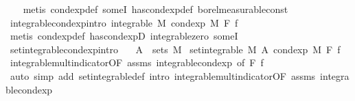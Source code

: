 \begin{isabellebody}
%
\isadelimproof
\ \ %
\endisadelimproof
%
\isatagproof
{}\isamarkupfalse%
\ {\isacharparenleft}{\kern0pt}metis\ cond{\isacharunderscore}{\kern0pt}exp{\isacharunderscore}{\kern0pt}def\ someI\ has{\isacharunderscore}{\kern0pt}cond{\isacharunderscore}{\kern0pt}exp{\isacharunderscore}{\kern0pt}def\ borel{\isacharunderscore}{\kern0pt}measurable{\isacharunderscore}{\kern0pt}const{\isacharparenright}{\kern0pt}%
\endisatagproof
{\isafoldproof}%
%
\isadelimproof
\isanewline
%
\endisadelimproof
\isanewline
{}\isamarkupfalse%
\ integrable{\isacharunderscore}{\kern0pt}cond{\isacharunderscore}{\kern0pt}exp{\isacharbrackleft}{\kern0pt}intro{\isacharbrackright}{\kern0pt}{\isacharcolon}{\kern0pt}\ {\isachardoublequoteopen}integrable\ M\ {\isacharparenleft}{\kern0pt}cond{\isacharunderscore}{\kern0pt}exp\ M\ F\ f{\isacharparenright}{\kern0pt}{\isachardoublequoteclose}\ \isanewline
%
\isadelimproof
\ \ %
\endisadelimproof
%
\isatagproof
{}\isamarkupfalse%
\ {\isacharparenleft}{\kern0pt}metis\ cond{\isacharunderscore}{\kern0pt}exp{\isacharunderscore}{\kern0pt}def\ has{\isacharunderscore}{\kern0pt}cond{\isacharunderscore}{\kern0pt}expD{\isacharparenleft}{\kern0pt}{}{\isacharparenright}{\kern0pt}\ integrable{\isacharunderscore}{\kern0pt}zero\ someI{\isacharparenright}{\kern0pt}%
\endisatagproof
{\isafoldproof}%
%
\isadelimproof
\isanewline
%
\endisadelimproof
\isanewline
{}\isamarkupfalse%
\ set{\isacharunderscore}{\kern0pt}integrable{\isacharunderscore}{\kern0pt}cond{\isacharunderscore}{\kern0pt}exp{\isacharbrackleft}{\kern0pt}intro{\isacharbrackright}{\kern0pt}{\isacharcolon}{\kern0pt}\isanewline
\ \ \ {\isachardoublequoteopen}A\ {\isasymin}\ sets\ M{\isachardoublequoteclose}\isanewline
{}\ {\isachardoublequoteopen}set{\isacharunderscore}{\kern0pt}integrable\ M\ A\ {\isacharparenleft}{\kern0pt}cond{\isacharunderscore}{\kern0pt}exp\ M\ F\ f{\isacharparenright}{\kern0pt}{\isachardoublequoteclose}%
\isadelimproof
\ %
\endisadelimproof
%
\isatagproof
{}\isamarkupfalse%
\ integrable{\isacharunderscore}{\kern0pt}mult{\isacharunderscore}{\kern0pt}indicator{\isacharbrackleft}{\kern0pt}OF\ assms\ integrable{\isacharunderscore}{\kern0pt}cond{\isacharunderscore}{\kern0pt}exp{\isacharcomma}{\kern0pt}\ of\ F\ f{\isacharbrackright}{\kern0pt}\ \isamarkupfalse%
\ {\isacharparenleft}{\kern0pt}auto\ simp\ add{\isacharcolon}{\kern0pt}\ set{\isacharunderscore}{\kern0pt}integrable{\isacharunderscore}{\kern0pt}def\ intro{\isacharbang}{\kern0pt}{\isacharcolon}{\kern0pt}\ integrable{\isacharunderscore}{\kern0pt}mult{\isacharunderscore}{\kern0pt}indicator{\isacharbrackleft}{\kern0pt}OF\ assms\ integrable{\isacharunderscore}{\kern0pt}cond{\isacharunderscore}{\kern0pt}exp{\isacharbrackright}{\kern0pt}{\isacharparenright}{\kern0pt}%

\end{isabellebody}
